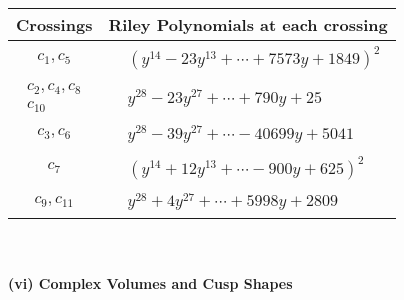 \documentclass[1p]{elsarticle_modified}
\theoremstyle{definition}
\begin{document}
\begin{tabular}{m{50pt}|m{274pt}}
Crossings & \hspace{64pt}Riley Polynomials at each crossing \\
\hline $$\begin{aligned}c_{1},c_{5}\end{aligned}$$&$\begin{aligned}
&(y^{14}-23 y^{13}+\cdots+7573 y+1849)^{2}
\end{aligned}$\\
\hline $$\begin{aligned}c_{2},c_{4},c_{8}\\c_{10}\end{aligned}$$&$\begin{aligned}
&y^{28}-23 y^{27}+\cdots+790 y+25
\end{aligned}$\\
\hline $$\begin{aligned}c_{3},c_{6}\end{aligned}$$&$\begin{aligned}
&y^{28}-39 y^{27}+\cdots-40699 y+5041
\end{aligned}$\\
\hline $$\begin{aligned}c_{7}\end{aligned}$$&$\begin{aligned}
&(y^{14}+12 y^{13}+\cdots-900 y+625)^{2}
\end{aligned}$\\
\hline $$\begin{aligned}c_{9},c_{11}\end{aligned}$$&$\begin{aligned}
&y^{28}+4 y^{27}+\cdots+5998 y+2809
\end{aligned}$\\
\hline
\end{tabular}\\~\\
\newpage\flushleft \textbf{(vi) Complex Volumes and Cusp Shapes}
\end{document}
